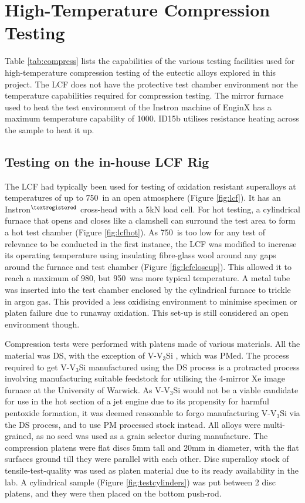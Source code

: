 \section{High-Temperature Compression Testing}\label{chap:highT}
 
Table \ref{tab:compress} lists the capabilities of the various testing facilities used for high-temperature compression testing of the eutectic alloys explored in this project.  The LCF does not have the protective test chamber environment nor the temperature capabilities required for compression testing.  The mirror furnace used to heat the test environment of the Instron machine of EnginX has a maximum temperature capability of 1000\celsius.  
ID15b utilises resistance heating across the sample to heat it up.

\subsection{Testing on the in-house LCF Rig}

The LCF had typically been used for testing of oxidation resistant superalloys at temperatures of up to 750\celsius\ in an open atmosphere (Figure \ref{fig:lcf}).  It has an Instron$^{\textregistered}$ cross-head with a 5kN load cell.  For hot testing, a cylindrical furnace that opens and closes like a clamshell can surround the test area to form a hot test chamber (Figure \ref{fig:lcfhot}). 
As 750\celsius\ is too low for any test of relevance to be conducted in the first instance, the LCF was modified to increase its operating temperature using insulating fibre-glass wool around any gaps around the furnace and test chamber (Figure \ref{fig:lcfcloseup}).  This allowed it to reach a maximum of 980\celsius, but 950\celsius\ was more typical temperature.  A metal tube was inserted into the test chamber enclosed by the cylindrical furnace to trickle in argon gas.  This provided a less oxidising environment to minimise specimen or platen failure due to runaway oxidation.  This set-up is still considered an open environment though. 

Compression tests were performed with platens made of various materials.  All the material was DS, with the exception of V-V$_3$Si , which was PMed.  The process required to get V-V$_3$Si manufactured using the DS process is a protracted process involving manufacturing suitable feedstock for utilising the 4-mirror Xe image furnace at the University of Warwick.  As V-V$_3$Si would not be a viable candidate for use in the hot section of a jet engine due to its propensity for harmful pentoxide formation, it was deemed reasonable to forgo manufacturing V-V$_3$Si via the DS process, and to use PM processed stock instead.  All alloys were multi-grained, as no seed was used as a grain selector during manufacture.  The compression platens were flat discs 5mm tall and 20mm in diameter, with the flat surfaces ground till they were parallel with each other.  Disc superalloy stock of tensile-test-quality was used as platen material due to its ready availability in the lab.  
A cylindrical sample (Figure \ref{fig:testcylinders}) was put between 2 disc platens, and they were then placed on the bottom push-rod.

